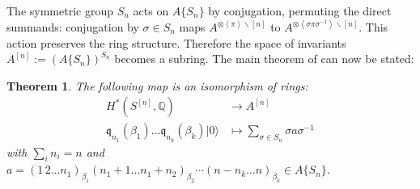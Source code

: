 \documentclass{amsart}
\newcommand{\hilb}[1]{^{[#1]}}
\newcommand{\vac}{|0\rangle}
\newcommand{\IQ}{\mathbb{Q}}
\newcommand{\kq}{\mathfrak{q}}
\theoremstyle{plain}
\newtheorem{theorem}{Theorem}[section]
\theoremstyle{definition}
\theoremstyle{remark}
\begin{document}
The symmetric group $S_n$ acts on $A\{S_n\}$ by conjugation, permuting the direct summands: conjugation by $\sigma\in S_n$ maps $A^{\otimes\left<\pi\right>\backslash[n]}$ to $A^{\otimes\left<\sigma\pi\sigma^{{-}1}\right>\backslash[n]}$.
This action preserves the ring structure. Therefore the space of invariants $A\hilb{n} := \left(A\{S_n\} \right)^{S_n}$ becomes a subring. The main theorem of \cite{LehnSorger} can now be stated:
\begin{theorem} \label{LSThm}\cite[Thm. 3.2.]{LehnSorger}
The following map is an isomorphism of rings:
\begin{align*}
H^\ast(S\hilb{n},\IQ) & \longrightarrow A\hilb{n} \\
\kq_{n_1}(\beta_1)\ldots \kq_{n_k}(\beta_k) \vac &\longmapsto \sum_{\sigma\in S_n} \sigma a \sigma^{{-}1} 
\end{align*}
with $\sum_i n_i=n$ and $a =(1\,2\ldots n_1)_{\beta_1}(n_1\! +\! 1\ldots n_1\!+\! n_2)_{\beta_2}\cdots (n\!-\!n_k \ldots n)_{\beta_k}\in A\{S_n\}$.
\end{theorem}
\end{document}
